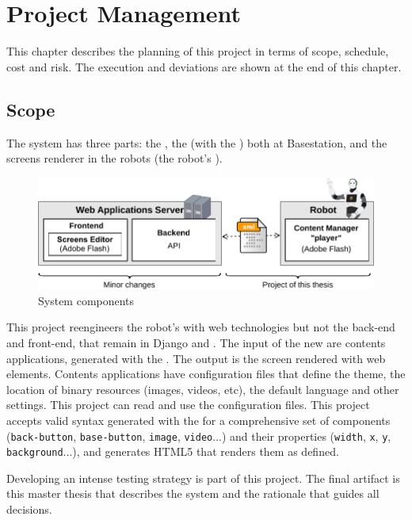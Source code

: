 \chapter{Project Management}
This chapter describes the planning of this project in terms of scope, schedule, cost and risk.
The execution and deviations are shown at the end of this chapter.

\section{Scope}
\label{sec:scope}
The system has three parts: the \flangobe, the \flangofe (with the \se) both at Basestation, and the screens renderer in the robots (the robot's \cm {}).

\begin{figure}[htb]
    \centering
    \includegraphics[width=14cm]{figures/intro-system-overview}
    \caption{System components}
    \label{fig:system-overview}
\end{figure}

This project reengineers the robot's \cm with web technologies but not the back-end and front-end, that remain in Django and \flash.
The input of the new \cm are contents applications, generated with the \se . The output is the screen rendered with web elements.
Contents applications have configuration files that define the theme, the location of binary resources (images, videos, etc), the default language and other settings. 
This project can read and use the configuration files.
This project accepts valid syntax generated with the \se for a comprehensive set of components (\texttt{back-button}, \texttt{base-button}, \texttt{image}, \texttt{video}...) and their properties (\texttt{width}, \texttt{x}, \texttt{y}, \texttt{background}...), and generates \ac{HTML5} that renders them as defined.

Developing an intense testing strategy is part of this project.
The final artifact is this master thesis that describes the system and the rationale that guides all decisions.

